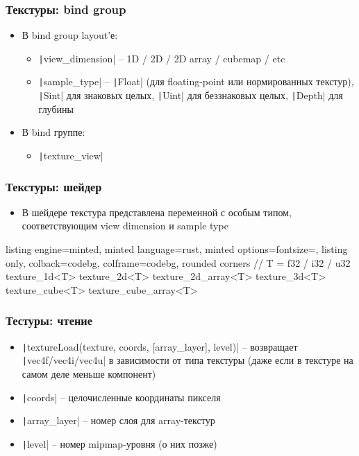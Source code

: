 \documentclass[10pt]{beamer}
\begin{document}
\begin{frame}[fragile]
\frametitle{Текстуры: bind group}
\begin{itemize}
\item В bind group layout'е:
\begin{itemize}
\item \texttt|view_dimension| -- 1D / 2D / 2D array / cubemap / etc
\item \texttt|sample_type| -- \texttt|Float| (для floating-point или нормированных текстур), \texttt|Sint| для знаковых целых, \texttt|Uint| для беззнаковых целых, \texttt|Depth| для глубины
\end{itemize}
\pause
\item В bind группе:
\begin{itemize}
\item \texttt|texture_view|
\end{itemize}
\end{itemize}
\end{frame}

\begin{frame}[fragile]
\frametitle{Текстуры: шейдер}
\begin{itemize}
\item В шейдере текстура представлена переменной с особым типом, соответствующим view dimension и sample type
\end{itemize}
\begin{tcblisting}{listing engine=minted, minted language=rust, minted options={fontsize=\scriptsize}, listing only, colback=codebg, colframe=codebg, rounded corners}
// T = f32 / i32 / u32
texture_1d<T>
texture_2d<T>
texture_2d_array<T>
texture_3d<T>
texture_cube<T>
texture_cube_array<T>
\end{tcblisting}
\end{frame}

\begin{frame}[fragile]
\frametitle{Тестуры: чтение}
\begin{itemize}
\item \texttt|textureLoad(texture, coords, [array_layer], level)| -- возвращает \texttt|vec4f/vec4i/vec4u| в зависимости от типа текстуры (даже если в текстуре на самом деле меньше компонент)
\pause
\item \texttt|coords| -- целочисленные координаты пикселя
\pause
\item \texttt|array_layer| -- номер слоя для array-текстур
\pause
\item \texttt|level| -- номер mipmap-уровня (о них позже)
\end{itemize}
\end{frame}
\end{document}

